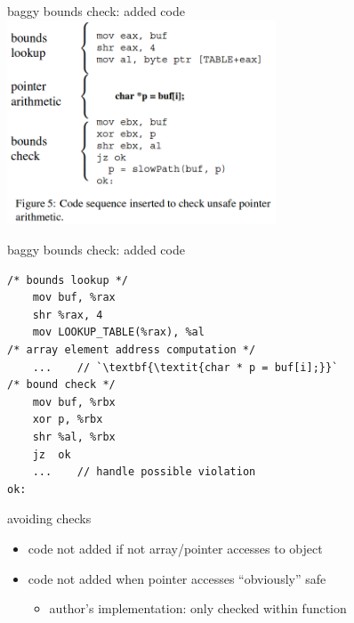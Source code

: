 
\begin{frame}{baggy bounds check: added code}
    \includegraphics[width=0.6\textwidth]{../bounds/bb-bounds-check}
\end{frame}

\begin{frame}[fragile,label=addedCode]{baggy bounds check: added code}
    \lstset{language=myasm,style=small}
    \begin{lstlisting}
/* bounds lookup */
    mov buf, %rax
    shr %rax, 4
    mov LOOKUP_TABLE(%rax), %al
/* array element address computation */
    ...    // `\textbf{\textit{char * p = buf[i];}}`
/* bound check */
    mov buf, %rbx
    xor p, %rbx
    shr %al, %rbx
    jz  ok
    ...    // handle possible violation
ok:
\end{lstlisting}

\end{frame}

\begin{frame}{avoiding checks}
    \begin{itemize}
        \item code not added if not array/pointer accesses to object
        \item code not added when pointer accesses ``obviously'' safe
            \begin{itemize}
            \item author's implementation: only checked within function
            \end{itemize}
    \end{itemize}
\end{frame}


